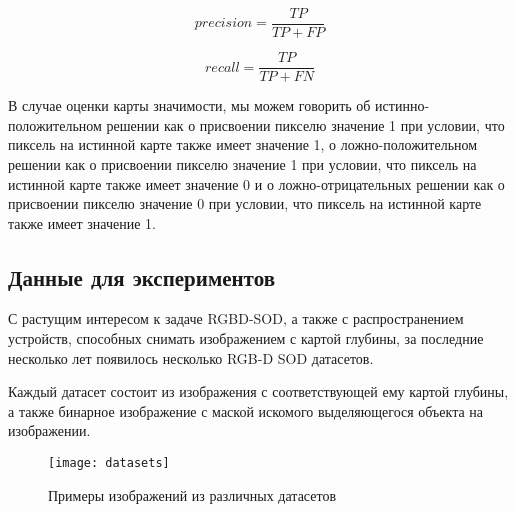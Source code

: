 \begin{equation}
    precision = \frac{TP}{TP+FP}
\end{equation}

\begin{equation}
    recall = \frac{TP}{TP+FN}
\end{equation}

В случае оценки карты значимости, мы можем
говорить об истинно-положительном решении
как о присвоении пикселю значение 1 при условии, что
пиксель на истинной карте также имеет значение 1,
о ложно-положительном решении как о присвоении пикселю значение 1 при условии, что
пиксель на истинной карте также имеет значение 0
и о ложно-отрицательных решении как о присвоении пикселю значение 0 при условии, что
пиксель на истинной карте также имеет значение 1.

\subsection{Данные для экспериментов}

С растущим интересом к задаче RGBD-SOD, а также с распространением устройств, способных
снимать изображением с картой глубины, за последние несколько лет появилось несколько RGB-D SOD датасетов.

Каждый датасет состоит из изображения с соответствующей ему картой глубины, а также
бинарное изображение с маской искомого выделяющегося объекта на изображении.

\begin{figure}[h]
    \centering
    \texttt{[image: datasets]}
    \caption{Примеры изображений из различных датасетов}
    \label{fig:dataset}
\end{figure}

